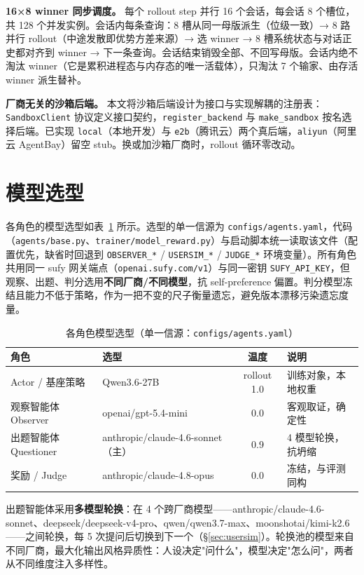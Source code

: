 \textbf{16×8 winner 同步调度。} 每个 rollout step 并行 16 个会话，每会话 8 个槽位，共 128 个并发实例。会话内每条查询：8 槽从同一母版派生（位级一致）→ 8 路并行 rollout（中途发散即优势方差来源）→ 选 winner → 8 槽系统状态与对话正史都对齐到 winner → 下一条查询。会话结束销毁全部、不回写母版。会话内绝不淘汰 winner（它是累积进程态与内存态的唯一活载体），只淘汰 7 个输家、由存活 winner 派生替补。

\textbf{厂商无关的沙箱后端。} 本文将沙箱后端设计为接口与实现解耦的注册表：\texttt{SandboxClient} 协议定义接口契约，\texttt{register\_backend} 与 \texttt{make\_sandbox} 按名选择后端。已实现 \texttt{local}（本地开发）与 \texttt{e2b}（腾讯云）两个真后端，\texttt{aliyun}（阿里云 AgentBay）留空 stub。换或加沙箱厂商时，rollout 循环零改动。

\section{模型选型}
\label{sec:sys-model}

各角色的模型选型如表~\ref{tab:model} 所示。选型的单一信源为 \texttt{configs/agents.yaml}，代码（\texttt{agents/base.py}、\texttt{trainer/model\_reward.py}）与启动脚本统一读取该文件（配置优先，缺省时回退到 \texttt{OBSERVER\_*} / \texttt{USERSIM\_*} / \texttt{JUDGE\_*} 环境变量）。所有角色共用同一 sufy 网关端点（\texttt{openai.sufy.com/v1}）与同一密钥 \texttt{SUFY\_API\_KEY}，但观察、出题、判分选用\textbf{不同厂商/不同模型}，抗 self-preference 偏置。判分模型冻结且能力不低于策略，作为一把不变的尺子衡量遗忘，避免版本漂移污染遗忘度量。

\begin{table}[htbp]
\centering
\caption{各角色模型选型（单一信源：\texttt{configs/agents.yaml}）}
\label{tab:model}
\begin{tabular}{llcl}
\toprule[1.5pt]
角色 & 选型 & 温度 & 说明 \\
\midrule[1pt]
Actor / 基座策略 & Qwen3.6-27B & rollout 1.0 & 训练对象，本地权重 \\
观察智能体 Observer & openai/gpt-5.4-mini & 0.0 & 客观取证，确定性 \\
出题智能体 Questioner & anthropic/claude-4.6-sonnet（主） & 0.9 & 4 模型轮换，抗坍缩 \\
奖励 / Judge & anthropic/claude-4.8-opus & 0.0 & 冻结，与评测同构 \\
\bottomrule[1.5pt]
\end{tabular}
\end{table}

出题智能体采用\textbf{多模型轮换}：在 4 个跨厂商模型——anthropic/claude-4.6-sonnet、deepseek/deepseek-v4-pro、qwen/qwen3.7-max、moonshotai/kimi-k2.6——之间轮换，每 5 次提问后切换到下一个（\S\ref{sec:usersim}）。轮换池的模型来自不同厂商，最大化输出风格异质性：人设决定"问什么"，模型决定"怎么问"，两者从不同维度注入多样性。

